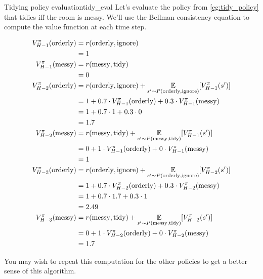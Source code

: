 \documentclass[../main/main]{subfiles}
\begin{document}
\begin{example}{Tidying policy evaluation}{tidy_eval}
    Let's evaluate the policy from \ref{eg:tidy_policy} that tidies iff the room is messy. We'll use the Bellman consistency equation to compute the value function at each time step.

    \begin{align*}
        V_{H-1}^\pi(\text{orderly}) &= r(\text{orderly}, \text{ignore}) \\
        &= 1 \\
        V_{H-1}^\pi(\text{messy}) &= r(\text{messy}, \text{tidy}) \\
        &= 0 \\
        V_{H-2}^\pi(\text{orderly}) &= r(\text{orderly}, \text{ignore}) + \operatorname*{\mathbb{E}}_{s' \sim P(\text{orderly}, \text{ignore})} [V_{H-1}^\pi(s')] \\
        &= 1 + 0.7 \cdot V_{H-1}^{\pi}(\text{orderly}) + 0.3 \cdot V_{H-1}^{\pi}(\text{messy}) \\
        &= 1 + 0.7 \cdot 1 + 0.3 \cdot 0 \\
        &= 1.7 \\
        V_{H-2}^\pi(\text{messy}) &= r(\text{messy}, \text{tidy}) + \operatorname*{\mathbb{E}}_{s' \sim P(\text{messy}, \text{tidy})} [V_{H-1}^\pi(s')] \\
        &= 0 + 1 \cdot V_{H-1}^{\pi}(\text{orderly}) + 0 \cdot V_{H-1}^{\pi}(\text{messy}) \\
        &= 1 \\
        V_{H-3}^\pi(\text{orderly}) &= r(\text{orderly}, \text{ignore}) + \operatorname*{\mathbb{E}}_{s' \sim P(\text{orderly}, \text{ignore})} [V_{H-2}^\pi(s')] \\
        &= 1 + 0.7 \cdot V_{H-2}^{\pi}(\text{orderly}) + 0.3 \cdot V_{H-2}^{\pi}(\text{messy}) \\
        &= 1 + 0.7 \cdot 1.7 + 0.3 \cdot 1 \\
        &= 2.49 \\
        V_{H-3}^\pi(\text{messy}) &= r(\text{messy}, \text{tidy}) + \operatorname*{\mathbb{E}}_{s' \sim P(\text{messy}, \text{tidy})} [V_{H-2}^\pi(s')] \\
        &= 0 + 1 \cdot V_{H-2}^{\pi}(\text{orderly}) + 0 \cdot V_{H-2}^{\pi}(\text{messy}) \\
        &= 1.7
    \end{align*}

    You may wish to repeat this computation for the other policies to get a better sense of this algorithm.
\end{example}
\end{document}
